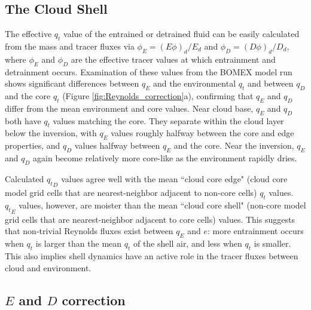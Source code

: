 \documentclass[draft,grl]{agutex}
\begin{document}
\begin{article}

\section{The Cloud Shell}

The effective $q_t$ value of the entrained or detrained fluid can be easily 
calculated from the mass and tracer fluxes via $\phi_E = (E\phi)_d / E_d$ and 
$\phi_D = (D\phi)_d / D_d$, where $\phi_E$ and $\phi_D$ are the effective 
tracer values at which entrainment and detrainment occurs.  Examination of 
these values from the BOMEX model run shows significant differences between 
$q_E$ and the environmental $q_t$ and between $q_D$ and the core $q_t$ (Figure 
\ref{fig:Reynolds_correction}a), confirming that $q_E$ and $q_D$ differ from
the mean environment and core values.  Near cloud base, $q_E$ and $q_D$ both 
have $q_t$ values matching the core.  They separate within the cloud layer 
below the inversion, with $q_E$ values roughly halfway between the core and 
edge properties, and $q_D$ values halfway between $q_E$ and the core.  Near the 
inversion, $q_E$ and $q_D$ again become relatively more core-like as the 
environment rapidly dries.

Calculated ${q_t}_D$ values agree well with the mean ``cloud core edge" (cloud 
core model grid cells that are nearest-neighbor adjacent to non-core cells) 
$q_t$ values.  ${q_t}_E$ values, however, are moister than the mean ``cloud 
core shell" (non-core model grid cells that are nearest-neighbor adjacent to 
core cells) values.  This suggests that non-trivial Reynolds fluxes exist 
between $q_E$ and $e$: more entrainment occurs when $q_t$ is larger than the 
mean $q_t$ of the shell air, and less when $q_t$ is smaller.  This also implies 
shell dynamics have an active role in the tracer fluxes between cloud and 
environment.


\subsection{$E$ and $D$ correction}
  

\end{article}
\end{document}

